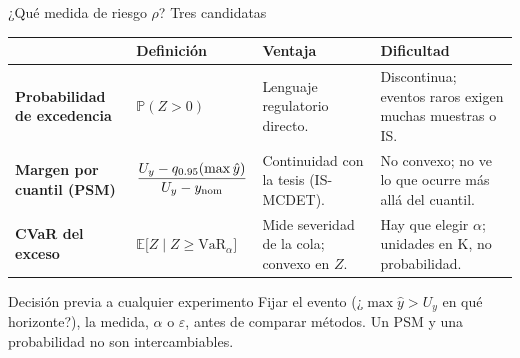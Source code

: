 \documentclass[aspectratio=169,10pt]{beamer}
\newcommand{\yhat}{\hat y}
\newcommand{\E}{\mathbb E}
\newcommand{\Prob}{\mathbb P}
\begin{document}
\begin{frame}{¿Qué medida de riesgo $\rho$? Tres candidatas}
\vspace{.1cm}
\small
\renewcommand{\arraystretch}{1.35}
\begin{tabular}{@{}>{\raggedright\arraybackslash\bfseries}p{2.3cm}L{3.3cm}L{3.2cm}L{3.8cm}@{}}
\toprule
& \textbf{Definición} & \textbf{Ventaja} & \textbf{Dificultad}\\
\midrule
Probabilidad de excedencia & $\Prob(Z>0)$ & Lenguaje regulatorio directo. & Discontinua; eventos raros exigen muchas muestras o IS.\\
Margen por cuantil (PSM) & $\dfrac{U_y-q_{0.95}(\max\yhat)}{U_y-y_{\rm nom}}$ & Continuidad con la tesis (IS-MCDET). & No convexo; no ve lo que ocurre más allá del cuantil.\\
CVaR del exceso & $\E\big[Z\mid Z\geq\mathrm{VaR}_\alpha\big]$ & Mide severidad de la cola; convexo en $Z$. & Hay que elegir $\alpha$; unidades en K, no probabilidad.\\
\bottomrule
\end{tabular}
\vspace{.35cm}
\begin{alertblock}{Decisión previa a cualquier experimento}
Fijar el evento (¿$\max\yhat>U_y$ en qué horizonte?), la medida, $\alpha$ o $\varepsilon$, antes de comparar métodos. Un PSM y una probabilidad no son intercambiables.
\end{alertblock}
\end{frame}
\end{document}
